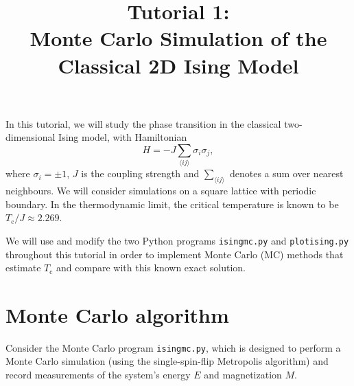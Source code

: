 \documentclass[letterpaper]{scrartcl}
\begin{document}


\title{Tutorial 1: \\ Monte Carlo Simulation of the \\ Classical 2D Ising Model}

\maketitle



In this tutorial, we will study the phase transition in the classical two-dimensional Ising model, with Hamiltonian
\begin{equation*}
H = -J \sum_{\langle ij \rangle} \sigma_i \sigma_j, 
\end{equation*}
where $\sigma_i = \pm 1$, $J$ is the coupling strength and $\sum_{\langle ij \rangle}$ denotes a sum over nearest neighbours.
We will consider simulations on a square lattice with periodic boundary.
In the thermodynamic limit, the critical temperature is known to be ${ T_\text{c} }/{J} \approx 2.269$.

We will use and modify the two Python programs \texttt{ising{\textunderscore}mc.py} and \texttt{plot{\textunderscore}ising.py} throughout this tutorial 
in order to implement Monte Carlo (MC) methods that estimate $T_\text{c}$ and compare with this known exact solution.

\section{Monte Carlo algorithm}
Consider the Monte Carlo program \texttt{ising{\textunderscore}mc.py}, which is designed to perform a Monte Carlo simulation (using the single-spin-flip Metropolis algorithm) and record measurements of the system's energy $E$ and magnetization $M$. 
\end{document}
